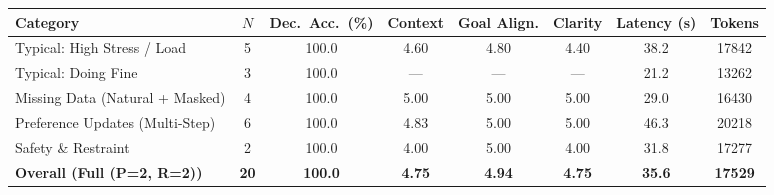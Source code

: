 \begin{tabular}{lccccccc}
\toprule
Category & $N$ & Dec.\ Acc.\ (\%) & Context & Goal Align. & Clarity & Latency (s) & Tokens \\
\midrule
Typical: High Stress / Load & 5 & 100.0 & 4.60 & 4.80 & 4.40 & 38.2 & 17842 \\
Typical: Doing Fine & 3 & 100.0 & --- & --- & --- & 21.2 & 13262 \\
Missing Data (Natural + Masked) & 4 & 100.0 & 5.00 & 5.00 & 5.00 & 29.0 & 16430 \\
Preference Updates (Multi-Step) & 6 & 100.0 & 4.83 & 5.00 & 5.00 & 46.3 & 20218 \\
Safety \& Restraint & 2 & 100.0 & 4.00 & 5.00 & 4.00 & 31.8 & 17277 \\
\midrule
\textbf{Overall (Full (P=2, R=2))} & \textbf{20} & \textbf{100.0} & \textbf{4.75} & \textbf{4.94} & \textbf{4.75} & \textbf{35.6} & \textbf{17529} \\
\bottomrule
\end{tabular}
